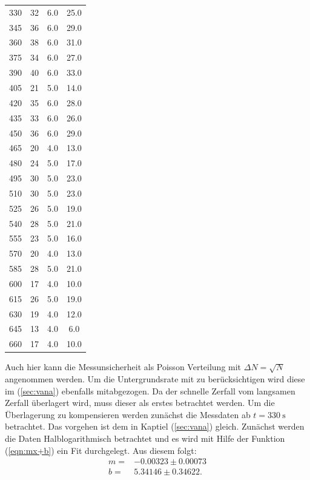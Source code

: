 \begin{longtable}{c c c c}
		330  	&  32  	&  6.0         	&  25.0 \\
		345  	&  36  	&  6.0         	&  29.0 \\
		360  	&  38  	&  6.0         	&  31.0 \\
		375  	&  34  	&  6.0         	&  27.0 \\
		390  	&  40  	&  6.0         	&  33.0 \\
		405  	&  21  	&  5.0         	&  14.0 \\
		420  	&  35  	&  6.0         	&  28.0 \\
		435  	&  33  	&  6.0         	&  26.0 \\
		450  	&  36  	&  6.0         	&  29.0 \\
		465  	&  20  	&  4.0         	&  13.0 \\
		480  	&  24  	&  5.0         	&  17.0 \\
		495  	&  30  	&  5.0         	&  23.0 \\
		510  	&  30  	&  5.0         	&  23.0 \\
		525  	&  26  	&  5.0         	&  19.0 \\
		540  	&  28  	&  5.0         	&  21.0 \\
		555  	&  23  	&  5.0         	&  16.0 \\
		570  	&  20  	&  4.0         	&  13.0 \\
		585  	&  28  	&  5.0         	&  21.0 \\
		600  	&  17  	&  4.0         	&  10.0 \\
		615  	&  26  	&  5.0         	&  19.0 \\
		630  	&  19  	&  4.0         	&  12.0 \\
		645  	&  13  	&  4.0         	&   6.0 \\
		660  	&  17  	&  4.0         	&  10.0 \\
\end{longtable}
\noindent
Auch hier kann die Messunsicherheit als Poisson Verteilung mit $\Delta N = \sqrt{N}$ angenommen werden. Um die Untergrundsrate mit zu berücksichtigen wird diese im (\ref{sec:vana}) ebenfalls 
mitabgezogen.
\noindent
Da der schnelle Zerfall vom langsamen Zerfall überlagert wird, muss dieser als erstes betrachtet werden. Um die Überlagerung zu kompensieren werden zunächst die Messdaten ab 
$t = \SI{330}{\second}$ betrachtet.
Das vorgehen ist dem in Kaptiel (\ref{sec:vana}) gleich. 
\noindent
Zunächst werden die Daten Halblogarithmisch betrachtet und es wird mit Hilfe der Funktion (\ref{eqn:mx+b}) ein Fit durchgelegt. Aus diesem folgt:
\begin{align*}
    m =& -0.00323 \pm 0.00073 \\
    b =& 5.34146 \pm  0.34622.
\end{align*}

